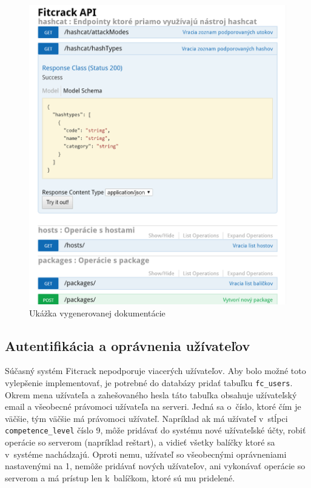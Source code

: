 \documentclass[../projekt.tex]{subfiles}
\begin{document}
\begin{figure}[H]
    \centering
    \label{fig:doc}
    \includegraphics[scale=0.45]{obrazky/doc.PNG}
    \caption{Ukážka vygenerovanej dokumentácie}
\end{figure}

\subsection{Autentifikácia a oprávnenia užívateľov}
Súčasný systém Fitcrack nepodporuje viacerých užívateľov. Aby bolo možné toto vylepšenie implementovať, je potrebné do databázy pridať tabuľku \texttt{fc\_users}. Okrem mena užívateľa a zahešovaného hesla táto tabuľka obsahuje užívateľský email a všeobecné právomoci užívateľa na serveri. Jedná sa o~číslo, ktoré čím je väčšie, tým väčšie má právomoci užívateľ. Napríklad ak má užívateľ v~stĺpci \texttt{competence\_level} číslo 9, môže pridávať do systému nové užívateľské účty, robiť operácie so serverom (napríklad reštart), a vidieť všetky balíčky ktoré sa v~systéme nachádzajú. Oproti nemu, užívateľ so všeobecnými oprávneniami nastavenými na 1, nemôže pridávať nových užívateľov, ani vykonávať operácie so serverom a má prístup len k~balíčkom, ktoré sú mu pridelené.
\end{document}
